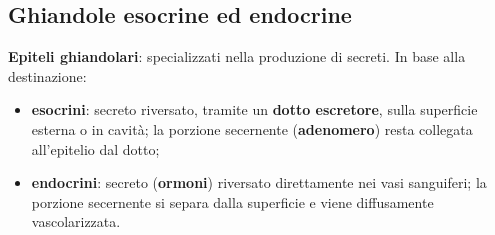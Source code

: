 \subsection{Ghiandole esocrine ed endocrine}
\textbf{Epiteli ghiandolari}: specializzati nella produzione di secreti. In base alla destinazione:
\begin{itemize}
  \item \textbf{esocrini}: secreto riversato, tramite un \textbf{dotto escretore}, sulla
    superficie esterna o in cavità; la porzione secernente (\textbf{adenomero}) resta collegata
    all'epitelio dal dotto;
  \item \textbf{endocrini}: secreto (\textbf{ormoni}) riversato direttamente nei vasi sanguiferi;
    la porzione secernente si separa dalla superficie e viene diffusamente vascolarizzata.
\end{itemize}

